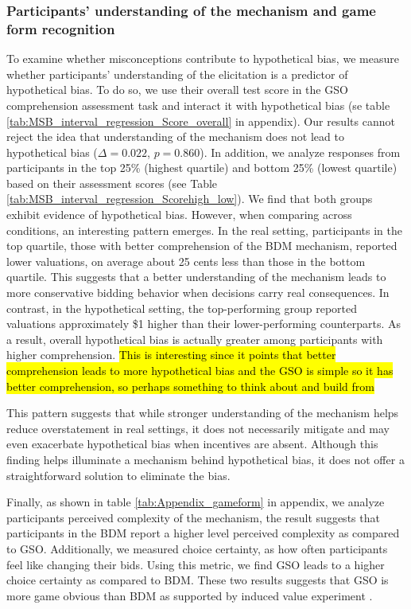 \documentclass[12pt]{article}
\begin{document}
\subsubsection{Participants' understanding of the mechanism and game form recognition}
To examine whether misconceptions contribute to hypothetical bias, we measure whether participants' understanding of the elicitation is a predictor of hypothetical bias. To do so, we use their overall test score in the GSO comprehension assessment task and interact it with hypothetical bias (se table \ref{tab:MSB_interval_regression_Score_overall} in appendix). Our results cannot reject the idea that understanding of the mechanism does not lead to hypothetical bias (\(\Delta = 0.022\), \(p = 0.860\)). In addition, we analyze responses from participants in the top 25\% (highest quartile) and bottom 25\% (lowest quartile) based on their assessment scores (see Table \ref{tab:MSB_interval_regression_Scorehigh_low}). We find that both groups exhibit evidence of hypothetical bias. However, when comparing across conditions, an interesting pattern emerges. In the real setting, participants in the top quartile, those with better comprehension of the BDM mechanism, reported lower valuations, on average about 25 cents less than those in the bottom quartile. This suggests that a better understanding of the mechanism leads to more conservative bidding behavior when decisions carry real consequences. In contrast, in the hypothetical setting, the top-performing group reported valuations approximately \$1 higher than their lower-performing counterparts. As a result, overall hypothetical bias is actually greater among participants with higher comprehension. \hl{This is interesting since it points that better comprehension leads to more hypothetical bias and the GSO is simple so it has better comprehension, so perhaps something to think about and build from}

This pattern suggests that while stronger understanding of the mechanism helps reduce overstatement in real settings, it does not necessarily mitigate and may even exacerbate hypothetical bias when incentives are absent. Although this finding helps illuminate a mechanism behind hypothetical bias, it does not offer a straightforward solution to eliminate the bias.

Finally, as shown in table \ref{tab:Appendix_gameform} in appendix,  we analyze participants perceived complexity of the mechanism, the result suggests that participants in the BDM report a higher level perceived complexity as compared to GSO. Additionally, we measured choice certainty, as how often participants feel like changing their bids. Using this metric, we find GSO leads to a higher choice certainty as compared to BDM. These two results suggests that GSO is more game obvious than BDM as supported by induced value experiment \citep{chakraborty_future_2025,brown_is_2023}.
\end{document}
